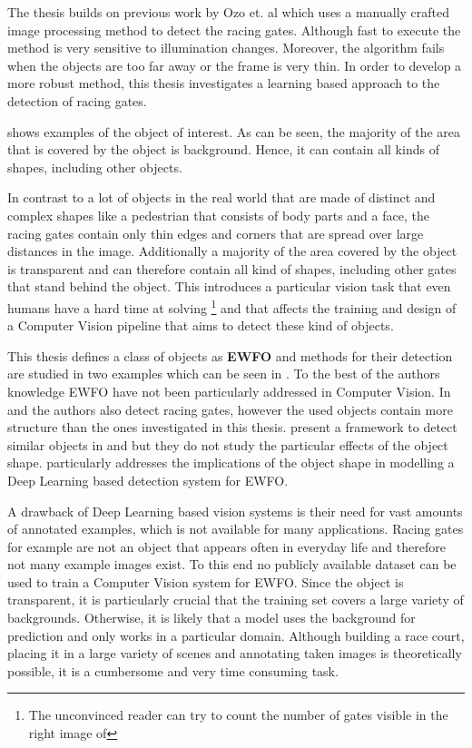 The thesis builds on previous work by Ozo et. al  which uses a manually crafted image processing method to detect the racing gates. Although fast to execute the method is very sensitive to illumination changes. Moreover, the algorithm fails when the objects are too far away or the frame is very thin. In order to develop a more robust method, this thesis investigates a learning based approach to the detection of racing gates.

 shows examples of the object of interest. As can be seen, the majority of the area that is covered by the object is background. Hence, it can contain all kinds of shapes, including other objects.

In contrast to a lot of objects in the real world that are made of distinct and complex shapes like a pedestrian that consists of body parts and a face, the racing gates contain only thin edges and corners that are spread over large distances in the image. Additionally a majority of the area covered by the object is transparent and can therefore contain all kind of shapes, including other gates that stand behind the object. This introduces a particular vision task that even humans have a hard time at solving \footnote{The unconvinced reader can try to count the number of gates visible in the right image of } and that affects the training and design of a Computer Vision pipeline that aims to detect these kind of objects.

This thesis defines a class of objects as \textbf{\ac{EWFO}} and methods for their detection are studied in two examples which can be seen in  . To the best of the authors knowledge \ac{EWFO} have not been particularly addressed in Computer Vision. In \cite{Falanga} and \cite{Li2018a} the authors also detect racing gates, however the used objects contain more structure than the ones investigated in this thesis. \citeauthor{Jung2018} present a framework to detect similar objects in \cite{Jung} and \cite{Jung2018} but they do not study the particular effects of the object shape.  particularly addresses the implications of the object shape in modelling a Deep Learning based detection system for \ac{EWFO}.

A drawback of Deep Learning based vision systems is their need for vast amounts of annotated examples, which is not available for many applications. Racing gates for example are not an object that appears often in everyday life and therefore not many example images exist. To this end no publicly available dataset can be used to train a Computer Vision system for \ac{EWFO}. Since the object is transparent, it is particularly crucial that the training set covers a large variety of backgrounds. Otherwise, it is likely that a model uses the background for prediction and only works in a particular domain. Although building a race court, placing it in a large variety of scenes and annotating taken images is theoretically possible, it is a cumbersome and very time consuming task. 

